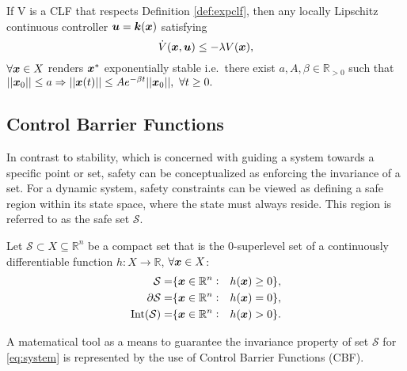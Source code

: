 \begin{theorem}\label{th:clftexp}
If V is a CLF that respects Definition \ref{def:expclf}, then any locally Lipschitz continuous controller $\boldsymbol{u}=\boldsymbol{k}(\boldsymbol{x})$ satisfying 
\begin{equation}
\dot{V}(\boldsymbol{x},\boldsymbol{u}) \leq -\lambda V(\boldsymbol{x}),
\end{equation}
$\forall \boldsymbol{x} \in X$ renders $\boldsymbol{x}^*$ exponentially stable i.e.~there exist $a,A,\beta \in \mathbb{R}_{>0}$ such that 
$|| \boldsymbol{x}_0 || \leq a \Rightarrow || \boldsymbol{x}(t) || \leq Ae^{-\beta t}|| \boldsymbol{x}_0 ||,~\forall t\geq 0.$
\end{theorem}

\subsection{Control Barrier Functions}

In contrast to stability, which is concerned with guiding a system towards a specific point or set, safety can be conceptualized as enforcing the invariance of a set. For a dynamic system, safety constraints can be viewed as defining a safe region within its state space, where the state must always reside. This region is referred to as the safe set $\mathcal{S}$. 

\begin{definition} Let $\mathcal{S}\subset X\subseteq \mathbb{R}^n$ be a compact set that is the $0$-superlevel set of a continuously  differentiable function $h:X\to\mathbb{R}$, $\forall \boldsymbol{x} \in X$:
    \begin{equation}
        \begin{aligned}
\mathcal{S} =& \{\boldsymbol{x}\in\mathbb{R}^n :& h(\boldsymbol{x})\geq 0\}, \\
\partial{\mathcal{S}} =& \{\boldsymbol{x}\in\mathbb{R}^n :& h(\boldsymbol{x})= 0\}, \\
\mathrm{Int}({\mathcal{S}}) =& \{\boldsymbol{x}\in\mathbb{R}^n :& h(\boldsymbol{x})> 0\}. \\
\end{aligned}
\end{equation}
\end{definition}
\noindent
A matematical tool as a means to guarantee the invariance property of set $\mathcal{S}$ for \eqref{eq:system} is represented by the use of Control Barrier Functions (CBF).

